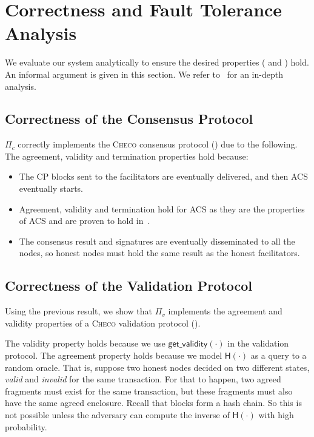 \section{Correctness and Fault Tolerance Analysis}
\label{sec:analysis}
We evaluate our system analytically to ensure the desired properties ( and ) hold.
An informal argument is given in this section.
We refer to~\cite[Chapter 4]{checo} for an in-depth analysis.

\subsection{Correctness of the Consensus Protocol}
$\Pi_c$ correctly implements the \textsc{Checo} consensus protocol () due to the following.
The agreement, validity and termination properties hold because:
\begin{itemize}
    \item The CP blocks sent to the facilitators are eventually delivered, and then ACS eventually starts.
    \item Agreement, validity and termination hold for ACS as they are the properties of ACS and are proven to hold in~\cite{miller2016honey}.
    \item The consensus result and signatures are eventually disseminated to all the nodes,
        so honest nodes must hold the same result as the honest facilitators.
\end{itemize}

\subsection{Correctness of the Validation Protocol}
\label{sec:correctness-of-validity}
Using the previous result,
we show that $\Pi_v$ implements the agreement and validity properties of a \textsc{Checo} validation protocol ().

The validity property holds because we use $\textsf{get\_validity}(\cdot)$ in the validation protocol.
The agreement property holds because we model $\textsf{H}(\cdot)$ as a query to a random oracle.
That is, suppose two honest nodes decided on two different states, \emph{valid} and \emph{invalid} for the same transaction.
For that to happen, two agreed fragments must exist for the same transaction,
but these fragments must also have the same agreed enclosure.
Recall that blocks form a hash chain.
So this is not possible unless the adversary can compute the inverse of $\textsf{H}(\cdot)$ with high probability.

